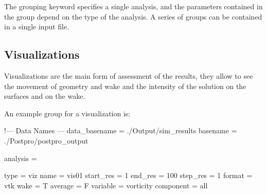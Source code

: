 The grouping keyword   specifies a single analysis, 
and the parameters contained in the group depend on the type of the analysis. 
A series of   groups can be contained in a single input file.

\subsection{Visualizations}

Visualizations are the main form of assessment of the results, 
they allow to see the movement of geometry and wake and the intensity 
of the solution on the surfaces and on the wake.

An example  group for a visualization is:

\begin{inputfile}[frame=single, caption={dust\_post.in for visualization}, 
  label={file:dust_post.in_viz}]
!--- Data Names ---
data_basename = ./Output/sim_results
basename =     ./Postpro/postpro_output

analysis = {

type = viz  
name = vis01
start_res = 1
end_res   = 100 
step_res  = 1
format = vtk
wake = T
average = F
variable = vorticity 
component = all

}
\end{inputfile}

